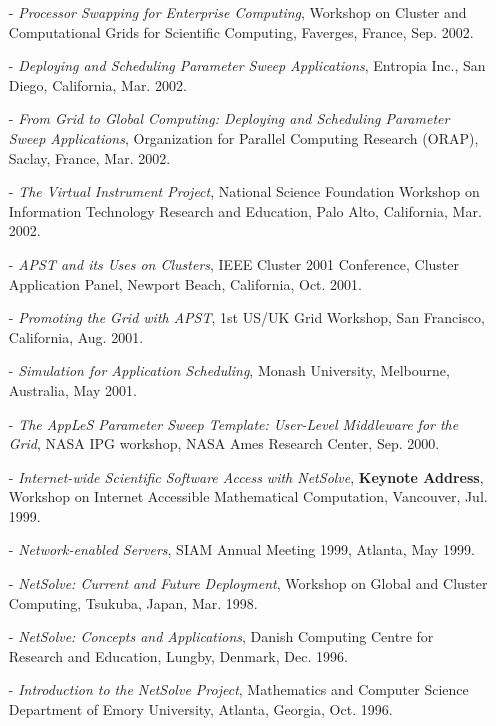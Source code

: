 \documentclass[times,11pt]{letter}
\begin{document}
\begin{itemize}
\item[-] {\it Processor Swapping for Enterprise Computing}, Workshop
on Cluster and Computational Grids for Scientific Computing, Faverges,
France, Sep. 2002.

\item[-] {\it Deploying and Scheduling Parameter Sweep Applications},
Entropia Inc., San Diego, California, Mar. 2002.

\item[-] {\it From Grid to Global Computing: Deploying and Scheduling
Parameter Sweep Applications}, Organization for Parallel Computing
Research (ORAP), Saclay, France, Mar. 2002.

\item[-] {\it The Virtual Instrument Project}, National Science Foundation
Workshop on Information Technology Research and Education, Palo Alto,
California, Mar. 2002.

\item[-] {\it APST and its Uses on Clusters}, IEEE Cluster 2001
Conference, Cluster Application Panel, Newport Beach, California,
Oct. 2001.

\item[-] {\it Promoting the Grid with APST}, 1st US/UK Grid Workshop,
San Francisco, California, Aug. 2001.

\item[-] {\it Simulation for Application Scheduling}, Monash University,
Melbourne, Australia, May 2001.

\item[-] {\it The AppLeS Parameter Sweep Template: User-Level Middleware
for the Grid}, NASA IPG workshop, NASA Ames Research Center, Sep.
2000.

\item[-] {\it Internet-wide Scientific Software Access with NetSolve},
{\bf Keynote Address},
Workshop on Internet Accessible Mathematical Computation, Vancouver,
Jul. 1999.

\item[-] {\it Network-enabled Servers}, SIAM Annual Meeting 1999, Atlanta,
May 1999.

\item[-] {\it NetSolve: Current and Future Deployment}, Workshop on
Global and Cluster Computing, Tsukuba, Japan, Mar. 1998.

\item[-] {\it NetSolve: Concepts and Applications}, Danish Computing
Centre for Research and Education, Lungby, Denmark, Dec. 1996.

\item[-] {\it Introduction to the NetSolve Project}, Mathematics and
Computer Science Department of Emory University, Atlanta, Georgia, Oct. 1996.

\end{itemize}
\end{document}
